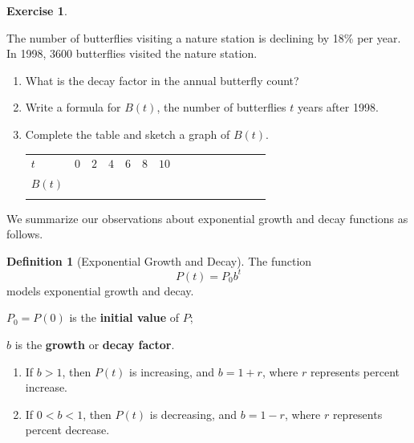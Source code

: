\documentclass[10pt,]{book}
\newcommand{\terminology}[1]{\textbf{#1}}
\theoremstyle{plain}
\theoremstyle{definition}
\newtheorem{definition}[theorem]{Definition}
\theoremstyle{definition}
\theoremstyle{definition}
\theoremstyle{definition}
\theoremstyle{definition}
\newtheorem{exercise}[theorem]{Exercise}
\numberwithin{equation}{section}
\newcommand{\hrulethin}  {\noalign{\hrule height 0.04em}}
\newcommand{\hrulethick} {\noalign{\hrule height 0.11em}}
\newcommand{\lt}{ < }
\newcommand{\gt}{ > }
\begin{document}
\begin{exercise}\label{exercise-butterflies}

The number of butterflies visiting a nature station is declining by 18\% per year. In 1998, \(3600\) butterflies visited the nature station.
\leavevmode%
\begin{enumerate}[label=*\alph**]
\item\hypertarget{li-645}{}What is the decay factor in the annual butterfly count?\item\hypertarget{li-646}{}Write a formula for \(B(t)\), the number of butterflies \(t\) years after 1998.\item\hypertarget{li-647}{}Complete the table and sketch a graph of \(B(t)\).
    \leavevmode%
\begin{table}
\centering
\begin{tabular}{AcAcAcAcAcAcAcA}\hrulethick
\(t\)&\(0\)&\(2\)&\(4\)&\(6\)&\(8\)&\(10\)\tabularnewline\hrulethin
\(B(t)\)&\(\)&\(\)&\(\)&\(\)&\(\)&\(\)\tabularnewline\hrulethin
\end{tabular}
\end{table}
\end{enumerate}
\end{exercise}
\par

    We summarize our observations about exponential growth and decay functions as follows.
%
\begin{definition}[Exponential Growth and Decay]\label{definition-8}
\index{}The function
\begin{equation*}
    P(t) = P_0 b^t
\end{equation*}
models exponential growth and decay.%
\par
\(P_0 =P(0)\) is the \terminology{initial value} of \(P\);%
\par
\(b\) is the \terminology{growth} \index{} or \terminology{decay factor}.%
\leavevmode%
\begin{enumerate}
\item\hypertarget{li-648}{}
        If \(b \gt 1\), then \(P(t)\) is increasing, and \(b = 1 + r\), where \(r\) represents percent increase.
    \item\hypertarget{li-649}{}
        If \(0 \lt b \lt 1\), then \(P(t)\) is decreasing, and \(b = 1 − r\), where \(r\) represents percent decrease.
    \end{enumerate}
\end{definition}
\typeout{************************************************}
\typeout{************************************************}
\end{document}
